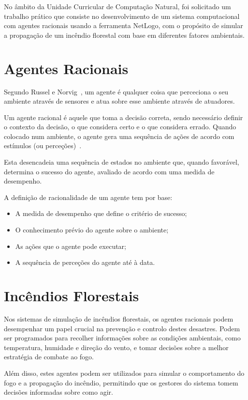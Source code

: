 No âmbito da Unidade Curricular de Computação Natural, foi solicitado um trabalho prático que consiste no desenvolvimento de um sistema computacional com agentes racionais usando a ferramenta NetLogo, com o propósito de simular a propagação de um incêndio florestal com base em diferentes fatores ambientais.

\section{Agentes Racionais}\label{sec:rational_agents}

Segundo Russel e Norvig~\cite{Russel2010IntelligentAgents}, um agente é qualquer coisa que perceciona o seu ambiente através de sensores e atua sobre esse ambiente através de atuadores.

Um agente racional é aquele que toma a decisão correta, sendo necessário definir o contexto da decisão, o que considera certo e o que considera errado.
Quando colocado num ambiente, o agente gera uma sequência de ações de acordo com estímulos (ou perceções)~\cite{Russel2010IntelligentAgents}.

Esta desencadeia uma sequência de estados no ambiente que, quando favorável, determina o sucesso do agente, avaliado de acordo com uma medida de desempenho.

A definição de racionalidade de um agente tem por base:
\begin{itemize}
    \item A medida de desempenho que define o critério de sucesso;
    \item O conhecimento prévio do agente sobre o ambiente;
    \item As ações que o agente pode executar;
    \item A sequência de perceções do agente até à data.
\end{itemize}

\section{Incêndios Florestais}\label{sec:forest_fires}

Nos sistemas de simulação de incêndios florestais, os agentes racionais podem desempenhar um papel crucial na prevenção e controlo destes desastres.
Podem ser programados para recolher informações sobre as condições ambientais, como temperatura, humidade e direção do vento, e tomar decisões sobre a melhor estratégia de combate ao fogo.

Além disso, estes agentes podem ser utilizados para simular o comportamento do fogo e a propagação do incêndio, permitindo que os gestores do sistema tomem decisões informadas sobre como agir.

